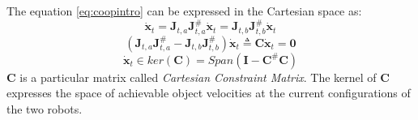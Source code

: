 %
%
\noindent The equation \eqref{eq:coopintro} can be expressed in the Cartesian space as:
\begin{equation}
	\dot{\boldsymbol{x}}_t = \boldsymbol{J}_{t,a} \boldsymbol{J}^\#_{t,a} \dot{\boldsymbol{x}}_t =  \boldsymbol{J}_{t,b} \boldsymbol{J}^\#_{t,b} 
	\dot{\boldsymbol{x}}_t 
\end{equation}
\begin{equation}
\label{eq:constrainMatrixC}
	(\boldsymbol{J}_{t,a} \boldsymbol{J}^\#_{t,a} - \boldsymbol{J}_{t,b} \boldsymbol{J}^\#_{t,b}) 
	\dot{\boldsymbol{x}}_t \triangleq \boldsymbol{C} \dot{\boldsymbol{x}}_t = \boldsymbol{0}
\end{equation}
\begin{equation}
	\dot{\boldsymbol{x}}_t \in ker(\boldsymbol{C}) = Span(\boldsymbol{I} - \boldsymbol{C}^\#\boldsymbol{C})
\end{equation}
$\boldsymbol{C}$ is a particular matrix called \textit{Cartesian Constraint Matrix}. The kernel of $\boldsymbol{C}$ expresses the space of achievable object velocities at the current configurations of the two robots.\\

